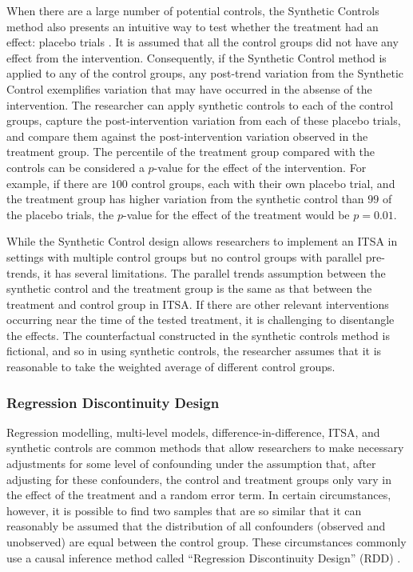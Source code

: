 \documentclass[12pt]{article}
\begin{document}
When there are a large number of potential controls, the Synthetic Controls method also presents an intuitive way to test whether the treatment had an effect: placebo trials \citep{abadieSyntheticControlMethods2010}. It is assumed that all the control groups did not have any effect from the intervention. Consequently, if the Synthetic Control method is applied to any of the control groups, any post-trend variation from the Synthetic Control exemplifies variation that may have occurred in the absense of the intervention. The researcher can apply synthetic controls to each of the control groups, capture the post-intervention variation from each of these placebo trials, and compare them against the post-intervention variation observed in the treatment group. The percentile of the treatment group compared with the controls can be considered a $p$-value for the effect of the intervention. For example, if there are $100$ control groups, each with their own placebo trial, and the treatment group has higher variation from the synthetic control than $99$ of the placebo trials, the $p$-value for the effect of the treatment would be $p=0.01$.

While the Synthetic Control design allows researchers to implement an ITSA in settings with multiple control groups but no control groups with parallel pre-trends, it has several limitations. The parallel trends assumption between the synthetic control and the treatment group is the same as that between the treatment and control group in ITSA. If there are other relevant interventions occurring near the time of the tested treatment, it is challenging to disentangle the effects. The counterfactual constructed in the synthetic controls method is fictional, and so in using synthetic controls, the researcher assumes that it is reasonable to take the weighted average of different control groups.

\subsubsection{Regression Discontinuity Design}

Regression modelling, multi-level models, difference-in-difference, ITSA, and synthetic controls are common methods that allow researchers to make necessary adjustments for some level of confounding under the assumption that, after adjusting for these confounders, the control and treatment groups only vary in the effect of the treatment and a random error term. In certain circumstances, however, it is possible to find two samples that are so similar that it can reasonably be assumed that the distribution of all confounders (observed and unobserved) are equal between the control group. These circumstances commonly use a causal inference method called ``Regression Discontinuity Design'' (RDD) \citep{moscoeRegressionDiscontinuityDesigns2015}.
\end{document}
